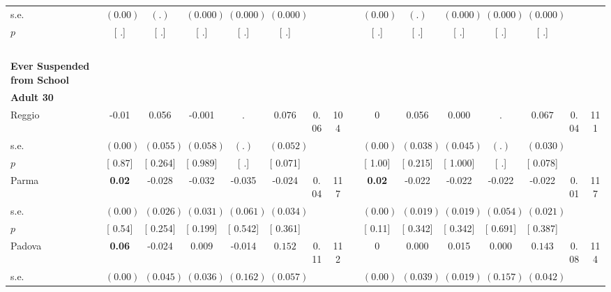 \begin{longtable}{L{8em} c c c c c c c p{1em} c c c c c c c}
\quad \quad \quad \quad s.e.& $ (     0.00)$ & $ (        .)$ & $ (    0.000)$ & $ (    0.000)$ & $ (    0.000)$ & & & & $ (     0.00)$ & $ (        .)$ & $ (    0.000)$ & $ (    0.000)$ & $ (    0.000)$ & &  \\*
\quad \quad \quad \quad $ p$ & [        .] & [        .] & [        .] & [        .] & [        .] & & & & [        .] & [        .] & [        .] & [        .] & [        .] & &  \\[1em]
~\\[1em]
\textbf{Ever Suspended from School} \\*
\quad \quad \textbf{Adult 30} & & & & & & & & & & & & & & & \\* 
\quad \quad \quad Reggio& -0.01 &     0.056 &    -0.001 &         . & $ \mathbf{    0.076}$ &      0.06 &       104 & & 0 &     0.056 &     0.000 &         . & $ \mathbf{    0.067}$ &      0.04 &       111  \\*
\quad \quad \quad \quad s.e.& $ (     0.00)$ & $ (    0.055)$ & $ (    0.058)$ & $ (        .)$ & $ (    0.052)$ & & & & $ (     0.00)$ & $ (    0.038)$ & $ (    0.045)$ & $ (        .)$ & $ (    0.030)$ & &  \\*
\quad \quad \quad \quad $ p$ & [     0.87] & [    0.264] & [    0.989] & [        .] & [    0.071] & & & & [     1.00] & [    0.215] & [    1.000] & [        .] & [    0.078] & &  \\[1em]
\quad \quad \quad Parma& \textbf{     0.02} &    -0.028 &    -0.032 &    -0.035 &    -0.024 &      0.04 &       117 & & \textbf{     0.02} &    -0.022 &    -0.022 &    -0.022 &    -0.022 &      0.01 &       117  \\*
\quad \quad \quad \quad s.e.& $ (     0.00)$ & $ (    0.026)$ & $ (    0.031)$ & $ (    0.061)$ & $ (    0.034)$ & & & & $ (     0.00)$ & $ (    0.019)$ & $ (    0.019)$ & $ (    0.054)$ & $ (    0.021)$ & &  \\*
\quad \quad \quad \quad $ p$ & [     0.54] & [    0.254] & [    0.199] & [    0.542] & [    0.361] & & & & [     0.11] & [    0.342] & [    0.342] & [    0.691] & [    0.387] & &  \\[1em]
\quad \quad \quad Padova& \textbf{     0.06} &    -0.024 &     0.009 &    -0.014 & $ \mathbf{    0.152}$ &      0.11 &       112 & & 0 &     0.000 &     0.015 &     0.000 & $ \mathbf{    0.143}$ &      0.08 &       114  \\*
\quad \quad \quad \quad s.e.& $ (     0.00)$ & $ (    0.045)$ & $ (    0.036)$ & $ (    0.162)$ & $ (    0.057)$ & & & & $ (     0.00)$ & $ (    0.039)$ & $ (    0.019)$ & $ (    0.157)$ & $ (    0.042)$ & &  \\*

\end{longtable}
